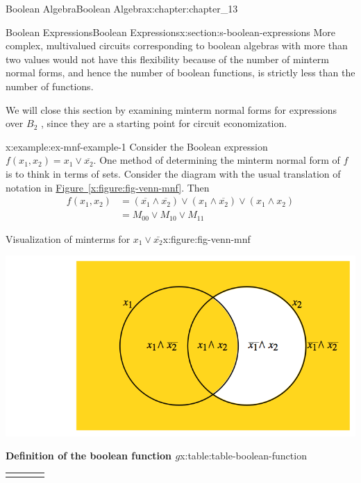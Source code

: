 \documentclass[oneside,10pt,]{book}
\newcommand{\tabularfont}{\relax}
\newcommand{\xreffont}{\relax}
\numberwithin{equation}{section}
\newcommand{\hrulethick} {\noalign{\hrule height 0.11em}}
\begin{document}
\begin{chapterptx}{Boolean Algebra}{}{Boolean Algebra}{}{}{x:chapter:chapter_13}
\begin{sectionptx}{Boolean Expressions}{}{Boolean Expressions}{}{}{x:section:s-boolean-expressions}
More complex, multivalued circuits corresponding to boolean algebras with more than two values would not have this flexibility because of the number of minterm normal forms, and hence the number of boolean functions, is strictly less than the number of functions.%
\par
We will close this section by examining minterm normal forms for expressions over \(B_2\) , since they are a starting point for circuit economization.%
\begin{example}{}{x:example:ex-mnf-example-1}%
Consider the Boolean expression \(f\left(x_1, x_2\right) =x_1 \lor \overline{x_2} \). One method of determining the minterm normal form of \(f\) is to think in terms of sets. Consider the diagram with the usual translation of notation in \hyperref[x:figure:fig-venn-mnf]{Figure~{\xreffont\ref{x:figure:fig-venn-mnf}}}. Then%
\begin{equation*}
\begin{split}
f\left(x_1, x_2\right)&=\left(\overline{x_1}\land \overline{x_2}\right)\lor \left(x_1\land \overline{x_2}\right)\lor \left(x_1\land
x_2\right)\\
& = M_{00} \lor M_{10} \lor M_{11}
\end{split}
\end{equation*}
%
\begin{figureptx}{Visualization of minterms for \(x_1 \lor \bar{x_2}\)}{x:figure:fig-venn-mnf}{}%
\begin{image}{0.15}{0.7}{0.15}%
\includegraphics[width=\linewidth]{images/fig-venn-mnf.png}
\end{image}%
\tcblower
\end{figureptx}%
\end{example}
\begin{tableptx}{\textbf{Definition of the boolean function \(g\)}}{x:table:table-boolean-function}{}%
\centering
{\tabularfont%
\begin{tabular}{cccc}\hrulethick

\end{tabular}}
\end{tableptx}
\end{sectionptx}
\end{chapterptx}
\end{document}
